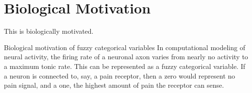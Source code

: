 \section{Biological Motivation}
\label{sec:bio}

This is biologically motivated.

Biological motivation of fuzzy categorical variables
In computational modeling of neural activity, the firing rate of a neuronal axon varies from nearly no activity to a maximum tonic rate. This can be represented as a fuzzy categorical variable. If a neuron is connected to, say, a pain receptor, then a zero would represent no pain signal, and a one, the highest amount of pain the receptor can sense.
